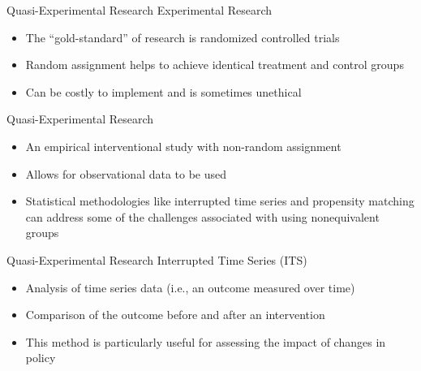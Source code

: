 \documentclass[10pt]{beamer}
\begin{document}
\begin{frame}{Quasi-Experimental Research}
    Experimental Research
    \begin{itemize}
        \item The “gold-standard” of research is randomized controlled trials
        \item Random assignment helps to achieve identical treatment and control groups
        \item Can be costly to implement and is sometimes unethical
    \end{itemize}
    Quasi-Experimental Research
    \begin{itemize}
        \item An empirical interventional study with non-random assignment
        \item Allows for observational data to be used
        \item Statistical methodologies like interrupted time series and propensity matching can address some of the challenges associated with using nonequivalent groups
    \end{itemize}
\end{frame}


\begin{frame}{Quasi-Experimental Research}
Interrupted Time Series (ITS)
    \begin{itemize}
        \item Analysis of time series data (i.e., an outcome measured over time)
        \item Comparison of the outcome before and after an intervention
        \item This method is particularly useful for assessing the impact of changes in policy
    \end{itemize}

\begin{table}
    \tabcolsep 3pt
    \label{tab:its1}
\end{table}
\end{frame}
\end{document}

